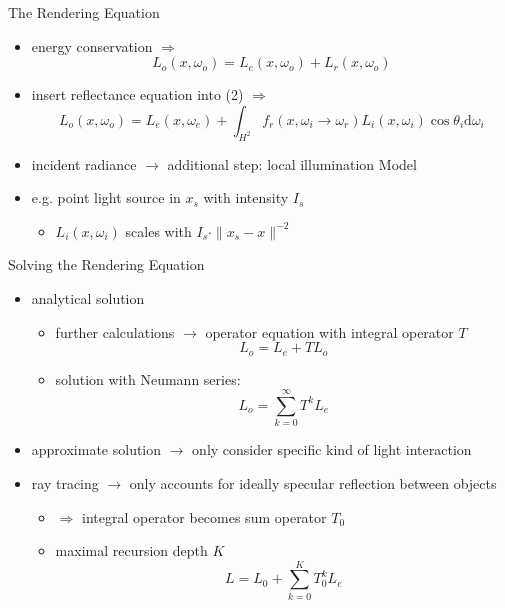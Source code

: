 \begin{frame}{The Rendering Equation}
\begin{itemize}
\pause
\item energy conservation $\Rightarrow$
\begin{equation}
L_o(x, \omega_o) =  L_e(x, \omega_o) +  L_r(x, \omega_o)
\end{equation}
\pause
\item insert reflectance equation into (2) $\Rightarrow$
\begin{equation} L_o(x, \omega_o) =  L_e(x, \omega_e) + \int_{H^2} f_r(x, \omega_i \rightarrow \omega_r) L_i(x, \omega_i) \cos \theta_i \mathrm{d}\omega_i 
\end{equation}
\pause
\item incident radiance $\rightarrow$ additional step: local illumination Model 
\pause
\item e.g. point light source in $x_s$ with intensity $I_s$ 
\begin{itemize}
    \item $L_i(x, \omega_i)$  scales with $I_s \cdot \|x_s -x\|^{-2}$
\end{itemize}
\end{itemize}
\end{frame}

\begin{frame}{Solving the Rendering Equation}
\begin{itemize}
\item analytical solution 
\begin{itemize}
\pause
\item  further calculations $\rightarrow$ operator equation with integral operator $T$
\begin{equation}
    L_o = L_e + TL_o
\end{equation}
\pause
\item solution with Neumann series: 
\begin{equation}
    L_o = \sum_{k= 0}^{\infty} T^k L_e
\end{equation}
\end{itemize}
\pause
\item approximate solution $\rightarrow$ only consider specific kind of light interaction
\pause
\item ray tracing $\rightarrow$ only accounts for ideally specular reflection between objects
\begin{itemize}
    \pause
    \item  $\Rightarrow$ integral operator becomes sum operator 
    $T_0$
    \pause
    \item maximal recursion depth $K$
    \pause
\begin{equation}
     L = L_0 + \sum_{k= 0}^{K} T_0^k L_e
\end{equation}
\end{itemize}
\end{itemize}
\end{frame}

